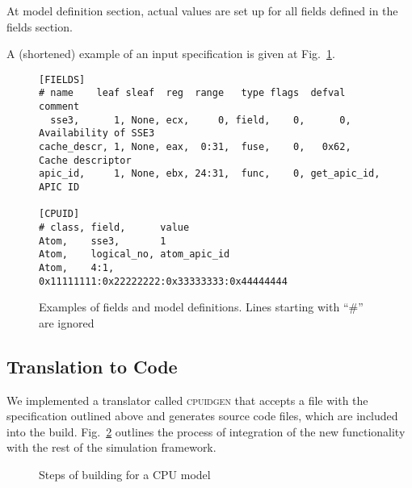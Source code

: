 \documentclass[a4paper,10pt,oneside,unicode]{article}
\newcommand{\cpuidgen}{\textsc{cpuidgen} }
\begin{document}
At model definition section, actual values are set up for all fields defined in the fields section.

A (shortened) example of an input specification is given at Fig.~\ref{fig:field-spec}.

\begin{figure}[htbp]
    \centering
\begin{verbatim}
[FIELDS]
# name    leaf sleaf  reg  range   type flags  defval       comment
  sse3,      1, None, ecx,     0, field,    0,      0,      Availability of SSE3
cache_descr, 1, None, eax,  0:31,  fuse,    0,   0x62,      Cache descriptor
apic_id,     1, None, ebx, 24:31,  func,    0, get_apic_id, APIC ID

[CPUID]
# class, field,      value
Atom,    sse3,       1
Atom,    logical_no, atom_apic_id
Atom,    4:1,        0x11111111:0x22222222:0x33333333:0x44444444

\end{verbatim}
\caption{Examples of fields and model definitions. Lines starting with “\#” are ignored}\label{fig:field-spec}
\end{figure}

\subsection{Translation to Code}

We implemented a translator called \cpuidgen that accepts a file with the specification outlined above and generates source code files, which are included into the build. Fig.~\ref{fig:workflow} outlines the process of integration of the new functionality with the rest of the simulation framework.

\begin{figure}[htbp]
\centering
{}
\caption{Steps of building for a CPU model} \label{fig:workflow}
\end{figure} 
\end{document}
